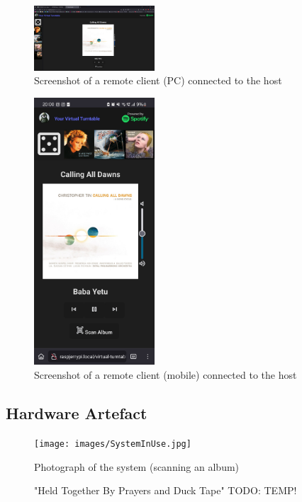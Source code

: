             \begin{figure}[h]
                \centering
                \includegraphics[width=0.4\textwidth]{images/screenshots/LAPTOP.png}
                \caption{Screenshot of a remote client (PC) connected to the host}
                \label{fig:laptop}
            \end{figure}
            
            \begin{figure}[h]
                \centering
                \includegraphics[width=0.4\textwidth]{images/screenshots/PHONE.jpg}
                \caption{Screenshot of a remote client (mobile) connected to the host}
                \label{fig:phone}
            \end{figure}
        
        \subsection{Hardware Artefact}
    
            \begin{figure}
                \centering
                \texttt{[image: images/SystemInUse.jpg]}
                \caption{Photograph of the system (scanning an album)}
                \label{fig:SystemInUse}
                \caption*{"Held Together By Prayers and Duck Tape" TODO: TEMP!}
            \end{figure}
    
